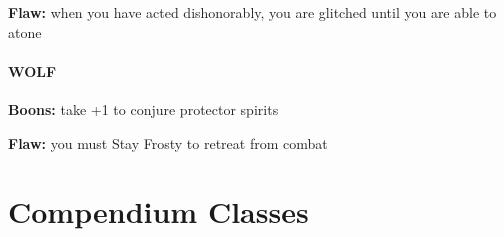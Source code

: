 \documentclass[oneside,10pt]{article}
\begin{document}
\begin{multicols}{2}
\begin{dent}
\textbf{Flaw:} when you have acted dishonorably, you are glitched until you are able to atone
\end{dent}


\paragraph{WOLF}
\begin{dent}
\textbf{Boons:} take +1 to conjure protector spirits

\textbf{Flaw:} you must Stay Frosty to retreat from combat
\end{dent}

\end{multicols}

\section{Compendium Classes}
\end{document}
